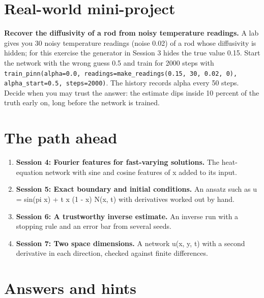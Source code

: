 \documentclass[11pt,a4paper]{article}
\begin{document}
\section{Real-world mini-project}
\textbf{Recover the diffusivity of a rod from noisy temperature readings.} A lab gives you 30 noisy temperature readings (noise 0.02) of a rod whose diffusivity is hidden; for this exercise the generator in Session 3 hides the true value 0.15. Start the network with the wrong guess 0.5 and train for 2000 steps with \texttt{train\_pinn(alpha=0.0, readings=make\_readings(0.15, 30, 0.02, 0), alpha\_start=0.5, steps=2000)}. The history records alpha every 50 steps. Decide when you may trust the answer: the estimate dips inside 10 percent of the truth early on, long before the network is trained.

\section{The path ahead}
\begin{enumerate}[nosep]
\item \textbf{Session 4: Fourier features for fast-varying solutions.} The heat-equation network with sine and cosine features of x added to its input.
\item \textbf{Session 5: Exact boundary and initial conditions.} An ansatz such as u = sin(pi x) + t x (1 - x) N(x, t) with derivatives worked out by hand.
\item \textbf{Session 6: A trustworthy inverse estimate.} An inverse run with a stopping rule and an error bar from several seeds.
\item \textbf{Session 7: Two space dimensions.} A network u(x, y, t) with a second derivative in each direction, checked against finite differences.
\end{enumerate}

\section{Answers and hints}
\end{document}
